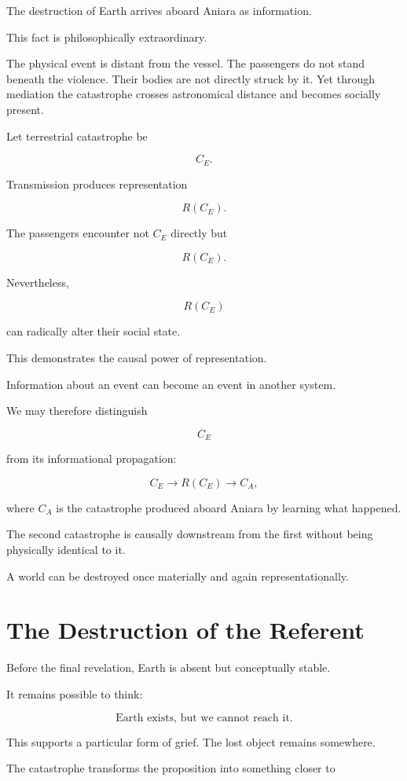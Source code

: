 \documentclass[11pt,oneside]{book}
\theoremstyle{definition}
\theoremstyle{remark}
\begin{document}
The destruction of Earth arrives aboard Aniara as information.

This fact is philosophically extraordinary.

The physical event is distant from the vessel. The passengers do not stand beneath the violence. Their bodies are not directly struck by it. Yet through mediation the catastrophe crosses astronomical distance and becomes socially present.

Let terrestrial catastrophe be

\[
C_E.
\]

Transmission produces representation

\[
R(C_E).
\]

The passengers encounter not \(C_E\) directly but

\[
R(C_E).
\]

Nevertheless,

\[
R(C_E)
\]

can radically alter their social state.

This demonstrates the causal power of representation.

Information about an event can become an event in another system.

We may therefore distinguish

\[
C_E
\]

from its informational propagation:

\[
C_E
\rightarrow
R(C_E)
\rightarrow
C_A,
\]

where \(C_A\) is the catastrophe produced aboard Aniara by learning what happened.

The second catastrophe is causally downstream from the first without being physically identical to it.

A world can be destroyed once materially and again representationally.

\section{The Destruction of the Referent}

Before the final revelation, Earth is absent but conceptually stable.

It remains possible to think:

\[
\text{Earth exists, but we cannot reach it.}
\]

This supports a particular form of grief. The lost object remains somewhere.

The catastrophe transforms the proposition into something closer to
\end{document}
